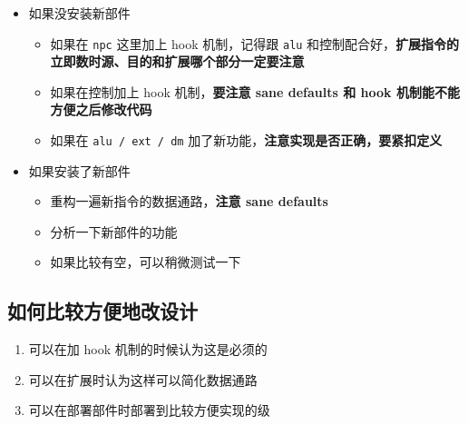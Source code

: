 \documentclass[12pt,AutoFakeBold,AutoFakeSlant]{article}
\providecommand{\tightlist}{%
  \setlength{\itemsep}{0pt}\setlength{\parskip}{0pt}}
\begin{document}
\begin{itemize}
\tightlist
\item
  如果没安装新部件

  \begin{itemize}
  \tightlist
  \item
    如果在 \texttt{npc} 这里加上 hook 机制，记得跟 \texttt{alu}
    和控制配合好，\textbf{扩展指令的立即数时源、目的和扩展哪个部分一定要注意}
  \item
    如果在控制加上 hook 机制，\textbf{要注意 sane defaults 和 hook
    机制能不能方便之后修改代码}
  \item
    如果在 \texttt{alu\ /\ ext\ /\ dm}
    加了新功能，\textbf{注意实现是否正确，要紧扣定义}
  \end{itemize}
\item
  如果安装了新部件

  \begin{itemize}
  \tightlist
  \item
    重构一遍新指令的数据通路，\textbf{注意 sane defaults}
  \item
    分析一下新部件的功能
  \item
    如果比较有空，可以稍微测试一下
  \end{itemize}
\end{itemize}

\hypertarget{ux5982ux4f55ux6bd4ux8f83ux65b9ux4fbfux5730ux6539ux8bbeux8ba1}{%
\subsection{如何比较方便地改设计}\label{ux5982ux4f55ux6bd4ux8f83ux65b9ux4fbfux5730ux6539ux8bbeux8ba1}}

\begin{enumerate}
\def\labelenumi{\arabic{enumi}.}
\tightlist
\item
  可以在加 hook 机制的时候认为这是必须的
\item
  可以在扩展时认为这样可以简化数据通路
\item
  可以在部署部件时部署到比较方便实现的级
\end{enumerate}
\end{document}
